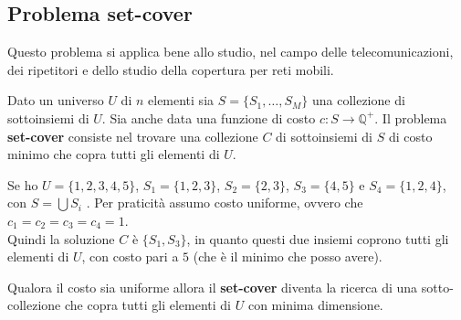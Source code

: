 \documentclass[a4paper,12pt, oneside]{book}
\begin{document}
\subsection{Problema set-cover}
Questo problema si applica bene allo studio, nel campo delle telecomunicazioni,
dei ripetitori e dello studio della copertura per reti mobili.
\begin{definizione}
  Dato un universo $U$ di $n$ elementi sia $S=\{S_1,\ldots,S_M\}$ una collezione
  di sottoinsiemi di $U$. Sia anche data una funzione di costo
  $c:S\to\mathbb{Q}^+$. Il problema \textbf{set-cover} consiste nel trovare una
  collezione $C$ di sottoinsiemi di $S$ di costo minimo che copra tutti gli
  elementi di $U$.
\end{definizione}
\begin{esempio}
  Se ho $U=\{1,2,3,4,5\}$, $S_1=\{1,2,3\}$, $S_2=\{2,3\}$, $S_3=\{4,5\}$ e
  $S_4=\{1,2,4\}$, con $S=\bigcup S_i$ . Per praticità assumo costo
  uniforme, ovvero che  $c_1=c_2=c_3=c_4=1$.\\
  Quindi la soluzione $C$ è $\{S_1,S_3\}$, in quanto questi due insiemi coprono
  tutti gli elementi di $U$, con costo pari a $5$ (che è il minimo che posso
  avere).
\end{esempio}
\begin{definizione}
  Qualora il costo sia uniforme allora il \textbf{set-cover} diventa la ricerca
  di una sotto-collezione che copra tutti gli elementi di $U$ con minima
  dimensione.
\end{definizione}
\end{document}
